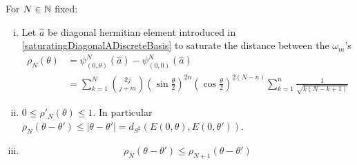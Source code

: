 \begin{lemma} \label{lemmaFormulaAuxiliaryDistanceAllN} \label{lemmaDerivativeAuxiliaryDistance}
For $N \in \mathbb{N}$ fixed:
    \begin{enumerate}[(i)]
    
    \item Let $\hat a$ be diagonal hermitian element introduced in \eqref{saturatingDiagonalADiscreteBasis} to saturate the distance between the $\omega_m$'s
    \begin{align}
        \rho_N(\theta) &= \psi^N_{(0, \theta)}(\hat a) - \psi^N_{(0, 0)}(\hat a) \\
        &   = \sum_{k = 1}^N \binom{2j}{j+m} (\sin \frac{\theta}{2})^{2n} (\cos \frac{\theta}{2})^{2(N-n)}  \sum_{k = 1}^n \frac{1}{\sqrt{k(N - k+1)}}
    \end{align}
    
    \item $0 \leq \rho'_N(\theta) \leq 1$. In particular $\rho_N(\theta - \theta') \leq |\theta - \theta'| = d_{S^2}(E(0, \theta), E(0, \theta'))$.
    
    \item
    \begin{equation}
        \rho_{N}(\theta - \theta') \leq \rho_{N+1}(\theta - \theta')
    \end{equation}
    \end{enumerate}
    
\end{lemma}
